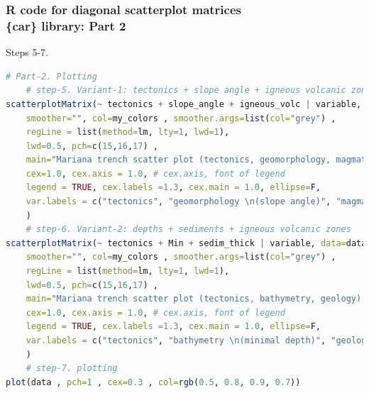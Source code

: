 \documentclass[pdflatex,compress,10pt,
	xcolor={dvipsnames,dvipsnames,svgnames,x11names,table},
	hyperref={colorlinks = true,breaklinks = true, urlcolor = NavyBlue, breaklinks = true}]{beamer}
\begin{document}
\begin{frame}[fragile]\frametitle{R code for diagonal scatterplot matrices\\ \{car\} library: Part 2}
Steps 5-7.
\begin{lstlisting}[language=R]
# Part-2. Plotting
	# step-5. Variant-1: tectonics + slope angle + igneous volcanic zones
scatterplotMatrix(~ tectonics + slope_angle + igneous_volc | variable, data=data ,  	
	smoother="", col=my_colors , smoother.args=list(col="grey") ,  
	regLine = list(method=lm, lty=1, lwd=1),
	lwd=0.5, pch=c(15,16,17) , 
	main="Mariana trench scatter plot (tectonics, geomorphology, magmatism) \nwith four tectonic plates options: Mariana, Caroline, Philippine, Pacific", 
	cex=1.0, cex.axis = 1.0, # cex.axis, font of legend
	legend = TRUE, cex.labels =1.3, cex.main = 1.0, ellipse=F,
	var.labels = c("tectonics", "geomorphology \n(slope angle)", "magmatism \n(igneous volcanic zones)")
	)
	# step-6. Variant-2: depths + sediments + igneous volcanic zones
scatterplotMatrix(~ tectonics + Min + sedim_thick | variable, data=data , 
	smoother="", col=my_colors , smoother.args=list(col="grey") ,  
	regLine = list(method=lm, lty=1, lwd=1),
	lwd=0.5, pch=c(15,16,17) , 
	main="Mariana trench scatter plot (tectonics, bathymetry, geology) \nwith four tectonic plates options: Mariana, Caroline, Philippine, Pacific", 
	cex=1.0, cex.axis = 1.0, # cex.axis, font of legend
	legend = TRUE, cex.labels =1.3, cex.main = 1.0, ellipse=F,
	var.labels = c("tectonics", "bathymetry \n(minimal depth)", "geology \n(sedimental thickness)")
	)
	# step-7. plotting
plot(data , pch=1 , cex=0.3 , col=rgb(0.5, 0.8, 0.9, 0.7))
\end{lstlisting}		
\end{frame}


\end{document}
